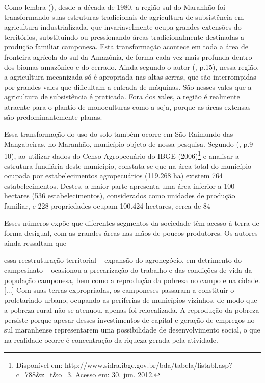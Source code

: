 Como lembra  (\citeyear{studte2008}), desde a década de 1980, a região sul do Maranhão foi transformando suas estruturas tradicionais de agricultura de subsistência em agricultura industrializada, que invariavelmente ocupa grandes extensões do territórios, substituindo ou pressionando áreas tradicionalmente destinadas a produção familiar camponesa. Esta transformação acontece em toda a área de fronteira agrícola do sul da Amazônia, de forma cada vez mais profunda dentro dos biomas amazônico e do cerrado. Ainda segundo o autor (\citeyear{studte2008}, p.15), nessa região, a agricultura mecanizada só é apropriada nas altas serras, que são interrompidas por grandes vales que dificultam a entrada de máquinas.  São nesses vales que a agricultura de subsistência é praticada. Fora dos vales, a região é realmente atraente para o plantio de monoculturas como a soja, porque as áreas extensas são predominantemente planas.

Essa transformação do uso do solo também ocorre em São Raimundo das Mangabeiras, no Maranhão, município objeto de nossa pesquisa. Segundo  (\citeyear{lima_locatel_silva}, p.9-10), ao utilizar dados do Censo Agropecuário do IBGE (2006)\footnote{Disponível em:
http://www.sidra.ibge.gov.br/bda/tabela/listabl.asp?c=788\&z=t\&o=3. Acesso em: 30. jun. 2012.} e analisar a estrutura fundiária deste município, constata-se que na área total do município ocupada por estabelecimentos agropecuários (119.268 ha) existem 764 estabelecimentos. Destes, a maior parte apresenta uma área inferior a 100 hectares (536 estabelecimentos), considerados como unidades de produção familiar, e 228 propriedades ocupam 100.424 hectares, cerca de 84%

Esses números expõe que diferentes segmentos da sociedade têm acesso à terra de forma desigual, com as grandes áreas nas mãos de poucos produtores. Os autores ainda ressaltam que

\begin{citacao}
essa reestruturação territorial – expansão do agronegócio, em detrimento do campesinato – ocasionou a precarização do trabalho e das condições de vida da população camponesa, bem como a reprodução da pobreza no campo e na cidade. [...] Com suas terras expropriadas, os camponeses passaram a constituir o proletariado urbano, ocupando as periferias de municípios vizinhos, de modo que a pobreza rural não se atenuou, apenas foi relocalizada. A reprodução da pobreza persiste porque apesar desses investimentos de capital e geração de empregos no sul maranhense representarem uma possibilidade de desenvolvimento social, o que na realidade ocorre é concentração da riqueza gerada pela atividade.
\cite[p. 12-16]{lima_locatel_silva}
\end{citacao}

